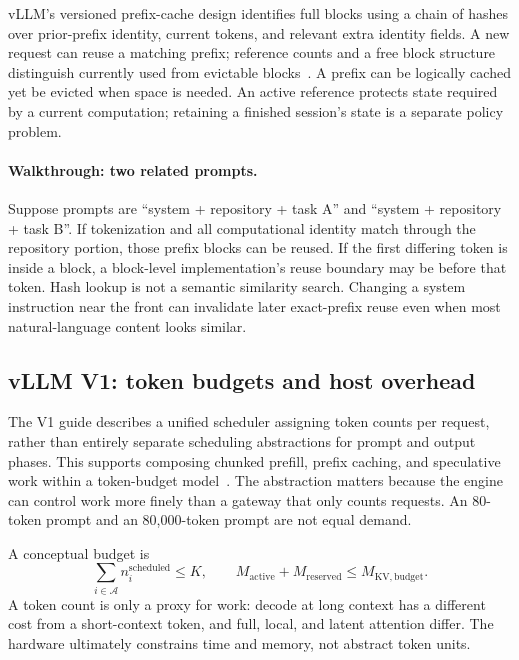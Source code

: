 
vLLM's versioned prefix-cache design identifies full blocks using a chain of
hashes over prior-prefix identity, current tokens, and relevant extra identity
fields. A new request can reuse a matching prefix; reference counts and a free
block structure distinguish currently used from evictable blocks~\cite{prefix}.
A prefix can be logically cached yet be evicted when space is needed. An active
reference protects state required by a current computation; retaining a
finished session's state is a separate policy problem.

\paragraph{Walkthrough: two related prompts.}
Suppose prompts are ``system + repository + task A'' and ``system + repository +
task B''. If tokenization and all computational identity match through the
repository portion, those prefix blocks can be reused. If the first differing
token is inside a block, a block-level implementation's reuse boundary may be
before that token. Hash lookup is not a semantic similarity search. Changing a
system instruction near the front can invalidate later exact-prefix reuse even
when most natural-language content looks similar.

\subsection{vLLM V1: token budgets and host overhead}
The V1 guide describes a unified scheduler assigning token counts per request,
rather than entirely separate scheduling abstractions for prompt and output
phases. This supports composing chunked prefill, prefix caching, and speculative
work within a token-budget model~\cite{v1}. The abstraction matters because the
engine can control work more finely than a gateway that only counts requests.
An 80-token prompt and an 80,000-token prompt are not equal demand.

A conceptual budget is
\begin{equation}
 \sum_{i\in\mathcal A}n_i^{\mathrm{scheduled}}\le K,
 \qquad M_{\mathrm{active}}+M_{\mathrm{reserved}}\le M_{\mathrm{KV,budget}}.
\end{equation}
A token count is only a proxy for work: decode at long context has a different
cost from a short-context token, and full, local, and latent attention differ.
The hardware ultimately constrains time and memory, not abstract token units.

